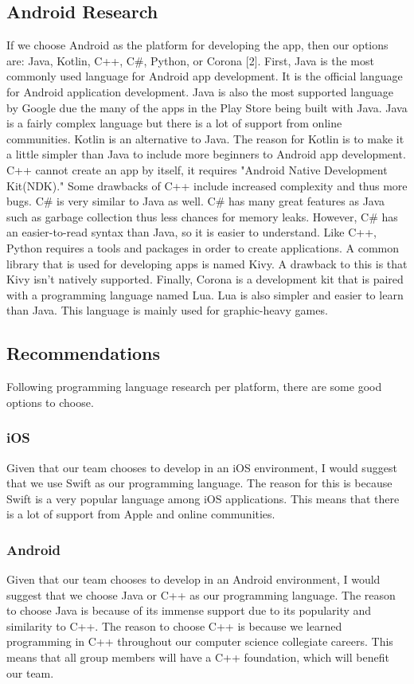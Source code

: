 \documentclass[onecolumn, draftclsnofoot,10pt, journal, letterpaper]{IEEEtran}
\begin{document}
    \subsection{Android Research}
        If we choose Android as the platform for developing the app, then our options are: Java, Kotlin, C++, C\#, Python, or Corona [2]. First, Java is the most commonly used language for Android app development. It is the official language for Android application development. Java is also the most supported language by Google due the many of the apps in the Play Store being built with Java. Java is a fairly complex language but there is a lot of support from online communities. Kotlin is an alternative to Java. The reason for Kotlin is to make it a little simpler than Java to include more beginners to Android app development. C++ cannot create an app by itself, it requires "Android Native Development Kit(NDK)." Some drawbacks of C++ include increased complexity and thus more bugs. C\# is very similar to Java as well. C\# has many great features as Java such as garbage collection thus less chances for memory leaks. However, C\# has an easier-to-read syntax than Java, so it is easier to understand. Like C++, Python requires a tools and packages in order to create applications. A common library that is used for developing apps is named Kivy. A drawback to this is that Kivy isn't natively supported. Finally, Corona is a development kit that is paired with a programming language named Lua. Lua is also simpler and easier to learn than Java. This language is mainly used for graphic-heavy games.
    
    \subsection{Recommendations}
        Following programming language research per platform, there are some good options to choose.
        
        \subsubsection{iOS}
            Given that our team chooses to develop in an iOS environment, I would suggest that we use Swift as our programming language. The reason for this is because Swift is a very popular language among iOS applications. This means that there is a lot of support from Apple and online communities. 
            
        \subsubsection{Android}
            Given that our team chooses to develop in an Android environment, I would suggest that we choose Java or C++ as our programming language. The reason to choose Java is because of its immense support due to its popularity and similarity to C++. The reason to choose C++ is because we learned programming in C++ throughout our computer science collegiate careers. This means that all group members will have a C++ foundation, which will benefit our team.
    
\end{document}
